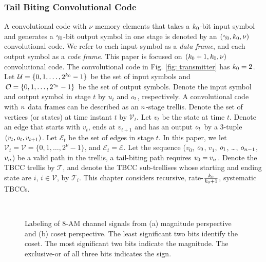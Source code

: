\documentclass [PhD] {uclathes}
\begin{document}
\subsubsection{Tail Biting Convolutional Code}
A  convolutional code with $\nu$ memory elements that takes a $k_0$-bit input symbol and generates a $\gamma_0$-bit output symbol in one stage is denoted by an $(\gamma_0,k_0,\nu)$ convolutional code. We refer to each input symbol as a \textit{data frame}, and each output symbol as a \textit{code frame}.  This paper is focused on $(k_0+1,k_0,\nu)$ convolutional code.
The convolutional code in Fig. \ref{fig: transmitter} has $k_0=2$. 
Let $\mathcal{U}=\{0,1,\dots,2^{k_0}-1\}$ be the set of input symbols and $\mathcal{O}=\{0,1,\dots,2^{\gamma_0}-1\}$ be the set of output symbols. 
Denote the input symbol and output symbol in stage $t$ by $u_t$ and $o_t$, respectively.
A convolutional code with $n$ data frames can be described as an $n$-stage trellis. 
Denote the set of vertices (or states) at time instant $t$ by $\mathcal{V}_t$. Let $v_t$ be the state at time $t$.
Denote an edge that starts with $v_t$, ends at $v_{t+1}$ and has an output $o_t$ by a 3-tuple $(v_t, o_t,v_{t+1})$. 
Let $\mathcal{E}_t$ be the set of edges in stage $t$.
In this paper, we let $\mathcal{\mathcal{V}}_t=\mathcal{V}=\{0,1,\dots,2^\nu -1 \}$, and $\mathcal{E}_t=\mathcal{E}$. Let the sequence ($v_0$, $o_0$, $v_1$, $o_1$, \dots, $o_{n-1}$, $v_{n}$) be a valid path in the trellis, a tail-biting path requires $v_0=v_{n}$. Denote the TBCC trellis by $\mathcal{T}$, and denote the TBCC sub-trellises whose starting and ending state are $i$, $i\in\mathcal{V}$, by $\mathcal{T}_i$. This chapter considers recursive, rate-$\frac{k_0}{k_0+1}$, systematic TBCCs. 

\begin{figure}[t] 
    \centering
   \\
        \hfill
\caption{Labeling of 8-AM channel signals from (a) magnitude perspective and (b) coset perspective.   The least significant two bits identify the coset. The most significant two bits indicate the magnitude.  The exclusive-or of all three bits indicates the sign.} \label{fig: 8-AM-set-partition}
\end{figure}
\end{document}
